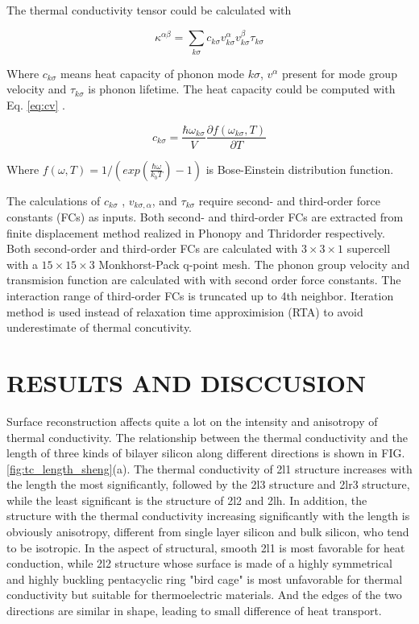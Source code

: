 \documentclass[%
 reprint,
 amsmath,amssymb,
 aps,
 prb,
]{revtex4-1}
\begin{document}
The thermal conductivity tensor could be calculated with

\begin{equation}
  \kappa^{\alpha\beta} = \sum_{k \sigma}{c_{k \sigma}v^{\alpha}_{k \sigma}v^{\beta}_{k \sigma}\tau_{k \sigma}} \label{eq:kappasum}
\end{equation}

Where $c_{k \sigma}$ means heat capacity of phonon mode $k \sigma$, $v^{\alpha}$ present for mode group velocity and $\tau_{k \sigma}$ is phonon lifetime. The heat capacity  could be computed with Eq. \ref{eq:cv} .

\begin{equation}
  c_{k \sigma}=\frac{\hbar \omega_{k \sigma} }{V} \frac{\partial f(\omega_{k \sigma},T)}{\partial T} \label{eq:cv}
\end{equation}

Where $ f(\omega,T)=1/(exp(\frac{\hbar \omega}{k_b T})-1)$ is Bose-Einstein distribution function.

The calculations of $c_{k\sigma}$ , $v_{k\sigma,\alpha}$, and $\tau_{k\sigma}$ require second- and third-order force constants (FCs) as inputs. Both second- and third-order FCs are extracted from finite displacement method realized in Phonopy\cite{Togo2008} and Thridorder respectively. Both second-order and third-order  FCs are calculated with $3 \times 3 \times 1$ supercell with a $15\times 15 \times 3$ Monkhorst-Pack q-point mesh. The phonon group velocity  and transmision function are calculated with  with second order force constants. The interaction range of third-order FCs is truncated up to 4th neighbor. Iteration method is used instead of relaxation time approximision (RTA) to avoid underestimate of thermal concutivity.

\section{RESULTS AND DISCCUSION}

Surface reconstruction affects quite a lot on the intensity and anisotropy of thermal conductivity. The relationship between the thermal conductivity  and the length of three kinds of bilayer silicon along different directions is shown in FIG.\ref{fig:tc_length_sheng}(a). The thermal conductivity of 2l1 structure increases with the length the most significantly, followed by the 2l3 structure and 2lr3 structure, while the least significant is the structure of 2l2 and 2lh. In addition, the structure with the thermal conductivity increasing significantly with the length is obviously anisotropy, different from single layer silicon and bulk silicon, who tend to be isotropic. In the aspect of structural, smooth 2l1 is most favorable for heat conduction, while 2l2 structure whose surface is made of a highly symmetrical and highly buckling pentacyclic ring "bird cage" is most unfavorable for thermal conductivity but suitable for thermoelectric materials. And the edges of the two directions are similar in shape, leading to small difference of heat transport.
\end{document}
